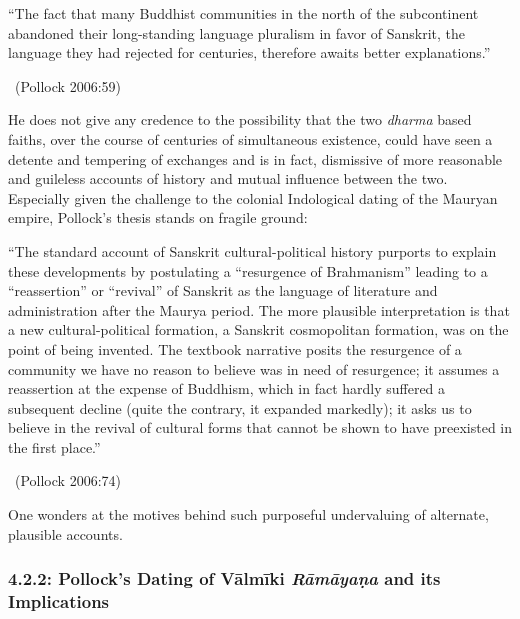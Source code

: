 \begin{myquote}
“The fact that many Buddhist communities in the north of the subcontinent abandoned their long-standing language pluralism in favor of Sanskrit, the language they had rejected for centuries, therefore awaits better explanations.” 

~\hfill (Pollock 2006:59)
\end{myquote}

He does not give any credence to the possibility that the two \textit{dharma} based faiths, over the course of centuries of simultaneous existence, could have seen a detente and tempering of exchanges and is in fact, dismissive of more reasonable and guileless accounts of history and mutual influence between the two. Especially given the challenge to the colonial Indological dating of the Mauryan empire, Pollock’s thesis stands on fragile ground:

\begin{myquote}
“The standard account of Sanskrit cultural-political history purports to explain these developments by postulating a “resurgence of Brahmanism” leading to a “reassertion” or “revival” of Sanskrit as the language of literature and administration after the Maurya period. The more plausible interpretation is that a new cultural-political formation, a Sanskrit cosmopolitan formation, was on the point of being invented. The textbook narrative posits the resurgence of a community we have no reason to believe was in need of resurgence; it assumes a reassertion at the expense of Buddhism, which in fact hardly suffered a subsequent decline (quite the contrary, it expanded markedly); it asks us to believe in the revival of cultural forms that cannot be shown to have preexisted in the first place.” 

~\hfill (Pollock 2006:74)
\end{myquote}

One wonders at the motives behind such purposeful undervaluing of alternate, plausible accounts.

\vspace{-.4cm}

\subsubsection*{4.2.2: Pollock’s Dating of Vālmīki \textit{Rāmāyaṇa} and its Implications}

\vspace{-.2cm}

